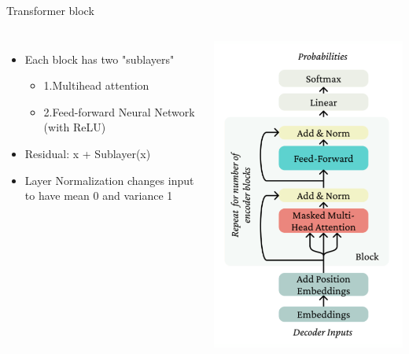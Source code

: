 \documentclass[serif, aspectratio=169]{beamer}
\begin{document}
\begin{frame}{Transformer block}
    \begin{columns}
        \begin{itemize}
            \item Each block has two "sublayers"
            \begin{itemize}
                \item[]  1.Multihead attention
                \item[] 2.Feed-forward Neural Network (with ReLU)
            \end{itemize}
            \item Residual: x + Sublayer(x)
            \item Layer Normalization changes input to have mean 0 and variance 1
        \end{itemize}
        \centering
        \includegraphics[width=.6\linewidth]{Figures/transformer-block.png}
    \end{columns}
\end{frame}
\end{document}
